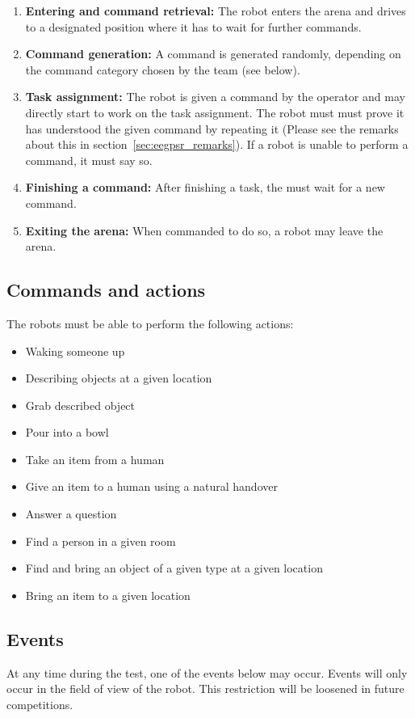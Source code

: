 \begin{enumerate}
	\item \textbf{Entering and command retrieval:} The robot enters the arena and drives to a designated position where it has to wait for further commands.
	\item \textbf{Command generation:} A command is generated randomly, depending on the command category chosen by the team (see below).
	\item \textbf{Task assignment:} The robot is given a command by the operator and may directly start to work on the task assignment. 
	The robot must must prove it has understood the given command by repeating it (Please see the remarks about this in section~\ref{sec:eegpsr_remarks}).
	If a robot is unable to perform a command, it must say so. 
	\item \textbf{Finishing a command:} After finishing a task, the must wait for a new command.
	\item \textbf{Exiting the arena:} When commanded to do so, a robot may leave the arena. 
\end{enumerate}

\subsection{Commands and actions}


The robots must be able to perform the following actions:
\begin{itemize}
 \item Waking someone up
 \item Describing objects at a given location
 \item Grab described object
 \item Pour into a bowl
 \item Take an item from a human
 \item Give an item to a human using a natural handover
 \item Answer a question
 \item Find a person in a given room
 \item Find and bring an object of a given type at a given location
 \item Bring an item to a given location
\end{itemize}


\subsection{Events}
At any time during the test, one of the events below may occur. 
Events will only occur in the field of view of the robot. 
This restriction will be loosened in future competitions. 

